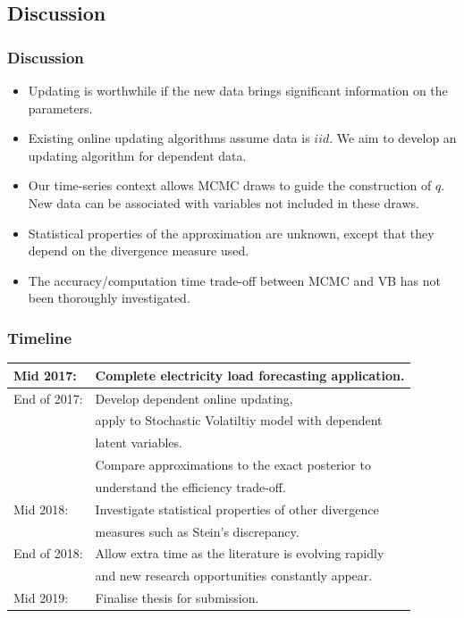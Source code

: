 \documentclass{beamer}\usepackage[]{graphicx}\usepackage[]{color}
\begin{document}
\begin{frame}
\section{Discussion}
\frametitle{Discussion}
\begin{itemize}
\item Updating is worthwhile if the new data brings significant information on the parameters.
\item Existing online updating algorithms assume data is $iid$. We aim to develop an updating algorithm for dependent data.
\item Our time-series context allows MCMC draws to guide the construction of $q$. New data can be associated with variables not included in these draws.
\item Statistical properties of the approximation are unknown, except that they depend on the divergence measure used.
\item The accuracy/computation time trade-off between MCMC and VB has not been thoroughly investigated.
\end{itemize}
\end{frame}


\begin{frame}
\frametitle{Timeline}
\begin{tabular}{| l | l |}
\hline
 Mid 2017: & Complete electricity load forecasting application. \\
 \hline
 End of 2017: & Develop dependent online updating, \\
 & apply to Stochastic Volatiltiy model with dependent \\
 & latent variables. \\
 & Compare approximations to the exact posterior to \\
 &understand the efficiency trade-off. \\
 \hline
 Mid 2018: & Investigate statistical properties of other divergence \\
 & measures such as Stein's discrepancy. \\
 \hline
 End of 2018: & Allow extra time as the literature is evolving rapidly \\
 & and new research opportunities constantly appear. \\
 \hline
 Mid 2019: & Finalise thesis for submission.\\
\hline
\end{tabular}
\end{frame}
\end{document}
